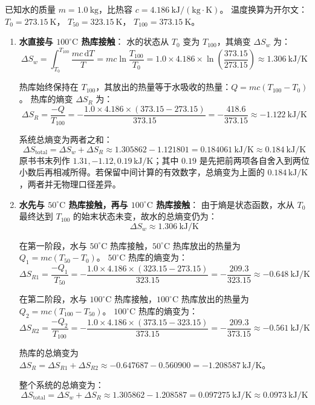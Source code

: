 \begin{solution}
已知水的质量 $m = 1.0 \ \mathrm{kg}$，比热容 $c = 4.186 \ \mathrm{kJ/(kg \cdot K)}$。
温度换算为开尔文：$T_0 = 273.15 \ \mathrm{K}$， $T_{50} = 323.15 \ \mathrm{K}$， $T_{100} = 373.15 \ \mathrm{K}$。

\begin{enumerate}
    \item[(a)] \textbf{水直接与 $100^\circ\mathrm{C}$ 热库接触}：
    水的状态从 $T_0$ 变为 $T_{100}$，其熵变 $\Delta S_w$ 为：
    $$ \Delta S_w = \int_{T_0}^{T_{100}} \frac{mc \, \mathrm{d}T}{T} = mc \ln\frac{T_{100}}{T_0} = 1.0 \times 4.186 \times \ln\left(\frac{373.15}{273.15}\right) \approx 1.306 \ \mathrm{kJ/K} $$
    
    热库始终保持在 $T_{100}$，其放出的热量等于水吸收的热量：$Q = mc(T_{100} - T_0)$。
    热库的熵变 $\Delta S_R$ 为：
    $$ \Delta S_R = \frac{-Q}{T_{100}} = -\frac{1.0 \times 4.186 \times (373.15 - 273.15)}{373.15} = -\frac{418.6}{373.15} \approx -1.122 \ \mathrm{kJ/K} $$
    
    系统总熵变为两者之和：
    $$ \Delta S_{\mathrm{total}} = \Delta S_w + \Delta S_R \approx 1.305862 - 1.121801 = 0.184061 \ \mathrm{kJ/K} \approx 0.184 \ \mathrm{kJ/K} $$
    原书书末列作 $1.31,-1.12,0.19\,\mathrm{kJ/K}$；其中 $0.19$ 是先把前两项各自舍入到两位小数后再相减所得。若保留中间计算的有效数字，总熵变为上面的 $0.184\,\mathrm{kJ/K}$，两者并无物理口径差异。

    \item[(b)] \textbf{水先与 $50^\circ\mathrm{C}$ 热库接触，再与 $100^\circ\mathrm{C}$ 热库接触}：
    由于熵是状态函数，水从 $T_0$ 最终达到 $T_{100}$ 的始末状态未变，故水的总熵变仍为：
    $$ \Delta S_w \approx 1.306 \ \mathrm{kJ/K} $$
    
    在第一阶段，水与 $50^\circ\mathrm{C}$ 热库接触，$50^\circ\mathrm{C}$ 热库放出的热量为 $Q_1 = mc(T_{50} - T_0)$。
    $50^\circ\mathrm{C}$ 热库的熵变为：
    $$ \Delta S_{R1} = \frac{-Q_1}{T_{50}} = -\frac{1.0 \times 4.186 \times (323.15 - 273.15)}{323.15} = -\frac{209.3}{323.15} \approx -0.648 \ \mathrm{kJ/K} $$
    
    在第二阶段，水与 $100^\circ\mathrm{C}$ 热库接触，$100^\circ\mathrm{C}$ 热库放出的热量为 $Q_2 = mc(T_{100} - T_{50})$。
    $100^\circ\mathrm{C}$ 热库的熵变为：
    $$ \Delta S_{R2} = \frac{-Q_2}{T_{100}} = -\frac{1.0 \times 4.186 \times (373.15 - 323.15)}{373.15} = -\frac{209.3}{373.15} \approx -0.561 \ \mathrm{kJ/K} $$
    
    热库的总熵变为 $\Delta S_R = \Delta S_{R1} + \Delta S_{R2} \approx -0.647687 - 0.560900 = -1.208587 \ \mathrm{kJ/K}$。
    
    整个系统的总熵变为：
    $$ \Delta S_{\mathrm{total}} = \Delta S_w + \Delta S_R \approx 1.305862 - 1.208587 = 0.097275 \ \mathrm{kJ/K} \approx 0.0973 \ \mathrm{kJ/K} $$
\end{enumerate}
\end{solution}

